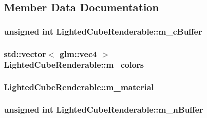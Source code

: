 \subsection{Member Data Documentation}
\hypertarget{classLightedCubeRenderable_aab6ae791b76f419fc6f0255718cc3ab1}{
\subsubsection[{m\+\_\+c\+Buffer}]{\setlength{\rightskip}{0pt plus 5cm}unsigned int Lighted\+Cube\+Renderable\+::m\+\_\+c\+Buffer\hspace{0.3cm}{\ttfamily [private]}}}\label{classLightedCubeRenderable_aab6ae791b76f419fc6f0255718cc3ab1}
\hypertarget{classLightedCubeRenderable_a8d300c68f52441ea4b0b8633cdb80a2c}{
\subsubsection[{m\+\_\+colors}]{\setlength{\rightskip}{0pt plus 5cm}std\+::vector$<$ glm\+::vec4 $>$ Lighted\+Cube\+Renderable\+::m\+\_\+colors\hspace{0.3cm}{\ttfamily [private]}}}\label{classLightedCubeRenderable_a8d300c68f52441ea4b0b8633cdb80a2c}
\hypertarget{classLightedCubeRenderable_a06c8156cc469df88e25ee2cdeb00fa4a}{
\subsubsection[{m\+\_\+material}]{ Lighted\+Cube\+Renderable\+::m\+\_\+material\hspace{0.3cm}{\ttfamily [private]}}}\label{classLightedCubeRenderable_a06c8156cc469df88e25ee2cdeb00fa4a}
\hypertarget{classLightedCubeRenderable_a65b42742eca437c5d84b75137abafbd7}{
\subsubsection[{m\+\_\+n\+Buffer}]{\setlength{\rightskip}{0pt plus 5cm}unsigned int Lighted\+Cube\+Renderable\+::m\+\_\+n\+Buffer\hspace{0.3cm}{\ttfamily [private]}}}\label{classLightedCubeRenderable_a65b42742eca437c5d84b75137abafbd7}
